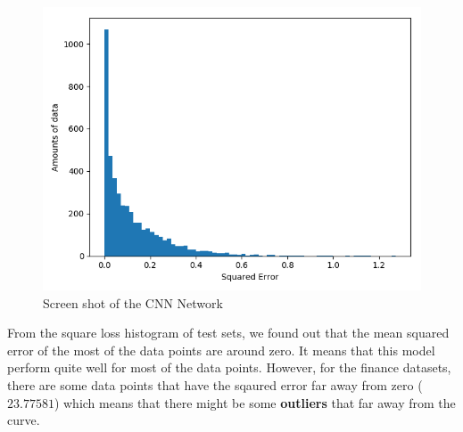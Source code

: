\documentclass{article}
\begin{document}
\begin{figure}[h]
  \centering
  \includegraphics[scale=0.3]{fifa_lg.png}
  \caption{Screen shot of the CNN Network}
\end{figure}


From the square loss histogram of test sets, we found out that the mean squared error of the most of the data points are around zero. It means that this model perform quite well for most of the data points. However, for the finance datasets, there are some data points that have the sqaured error far away from zero ($23.77581$) which means that there might be some \textbf{outliers} that far away from the curve.
\end{document}
